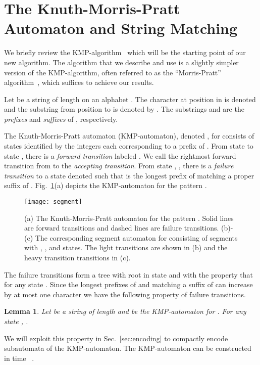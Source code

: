 \documentclass{article}
\newtheorem{lemma}{Lemma}
\begin{document}
\section{The Knuth-Morris-Pratt Automaton and String Matching}\label{sec:KMP}
We briefly review the KMP-algorithm~\cite{KMP1977} which will be the
starting point of our new algorithm. The algorithm that we describe
and use is a slightly simpler version of the KMP-algorithm, often
referred to as the ``Morris-Pratt'' algorithm~\cite{MP1970}, which
suffices to achieve our results.


Let  be a string of length  on an alphabet . The
character at position  in  is denoted  and the substring
from position  to  is denoted by . The substrings
 and  are the \emph{prefixes} and \emph{suffixes}
of , respectively.

The Knuth-Morris-Pratt automaton (KMP-automaton), denoted , for
 consists of  states identified by the integers  each corresponding to a prefix of . From state  to state
,  there is a \emph{forward transition} labeled
. We call the rightmost forward transition from  to  the
\emph{accepting transition}. From state , , there is
a \emph{failure transition} to a state denoted  such that
 is the longest prefix of  matching a proper suffix
of . Fig.~\ref{fig:segment}(a) depicts the KMP-automaton for
the pattern . \begin{figure}[t]
  \centering \texttt{[image: segment]}
  \caption{(a) The Knuth-Morris-Pratt automaton  for the pattern
    . Solid lines are forward transitions and
    dashed lines are failure transitions. (b)-(c) The corresponding
    segment automaton  for  consisting of  segments
    with , , and  states. The light transitions are shown in
    (b) and the heavy transition transitions in (c).}
   \label{fig:segment}
\end{figure}

The failure transitions form a tree with root in state  and with
the property that  for any state . Since the longest
prefixes of  and  matching a suffix of  can
increase by at most one character we have the following property of
failure transitions.
\begin{lemma}\label{lem:fail}
  Let  be a string of length  and  be the KMP-automaton
  for . For any state , .
\end{lemma}
We will exploit this property in Sec.~\ref{sec:encoding} to
compactly encode subautomata of the KMP-automaton. The KMP-automaton
can be constructed in time ~\cite{KMP1977}.
\end{document}
